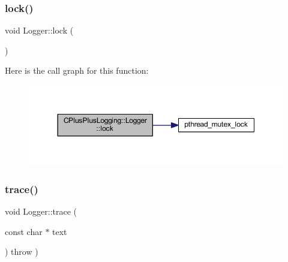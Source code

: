 \mbox{\label{class_c_plus_plus_logging_1_1_logger_ad9ba90f0c8ee8e73ff2f6d7217cc08d2}} 
\subsubsection{\texorpdfstring{lock()}{lock()}}
{\footnotesize\ttfamily void Logger\+::lock (\begin{DoxyParamCaption}{ }\end{DoxyParamCaption})\hspace{0.3cm}{\ttfamily [protected]}}

Here is the call graph for this function\+:
\nopagebreak
\begin{figure}[H]
\begin{center}
\leavevmode
\includegraphics[width=350pt]{class_c_plus_plus_logging_1_1_logger_ad9ba90f0c8ee8e73ff2f6d7217cc08d2_cgraph}
\end{center}
\end{figure}
\mbox{\label{class_c_plus_plus_logging_1_1_logger_a21070ebcd5a7dc4a4bfc29851d4fd62f}} 
\subsubsection{\texorpdfstring{trace()}{trace()}\hspace{0.1cm}{\footnotesize\ttfamily [1/3]}}
{\footnotesize\ttfamily void Logger\+::trace (\begin{DoxyParamCaption}\item[{const char $\ast$}]{text }\end{DoxyParamCaption}) throw  ) }

